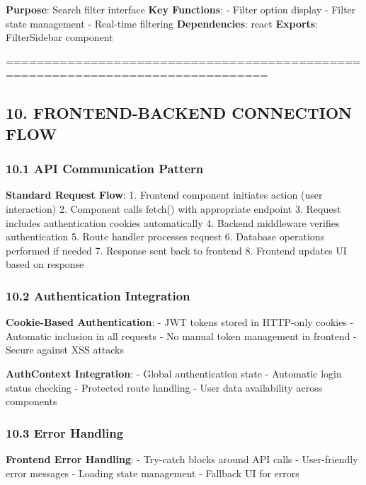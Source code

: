\documentclass[12pt,a4paper]{article}
\begin{document}
\textbf{Purpose}: Search filter interface \textbf{Key Functions}: -
Filter option display - Filter state management - Real-time filtering
\textbf{Dependencies}: react \textbf{Exports}: FilterSidebar component

================================================================================

\hypertarget{frontend-backend-connection-flow}{%
\subsection{10. FRONTEND-BACKEND CONNECTION
FLOW}\label{frontend-backend-connection-flow}}

\hypertarget{api-communication-pattern}{%
\subsubsection{10.1 API Communication
Pattern}\label{api-communication-pattern}}

\textbf{Standard Request Flow}: 1. Frontend component initiates action
(user interaction) 2. Component calls fetch() with appropriate endpoint
3. Request includes authentication cookies automatically 4. Backend
middleware verifies authentication 5. Route handler processes request 6.
Database operations performed if needed 7. Response sent back to
frontend 8. Frontend updates UI based on response

\hypertarget{authentication-integration}{%
\subsubsection{10.2 Authentication
Integration}\label{authentication-integration}}

\textbf{Cookie-Based Authentication}: - JWT tokens stored in HTTP-only
cookies - Automatic inclusion in all requests - No manual token
management in frontend - Secure against XSS attacks

\textbf{AuthContext Integration}: - Global authentication state -
Automatic login status checking - Protected route handling - User data
availability across components

\hypertarget{error-handling}{%
\subsubsection{10.3 Error Handling}\label{error-handling}}

\textbf{Frontend Error Handling}: - Try-catch blocks around API calls -
User-friendly error messages - Loading state management - Fallback UI
for errors
\end{document}
